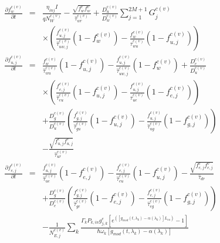 \documentclass[twocolumn]{el-author}
\begin{document}
\begingroup\makeatletter{}\check@mathfonts
\begin{eqnarray}
  \label{eq:pc_qd_qw}
  \frac{ {\partial}f^{c(v)}_{w} }{ {\partial}t } & = & 
	\frac{\eta_{inj}I}{qN^{c(v)}_{W}} - 
	\frac{ \sqrt{ f^{c}_{w} f^{v}_{w} } }{ \hat{\tau}^{c(v)}_{wr} } + 
	\frac{ D^{c(v)}_{u} }{ D^{c(v)}_{w} } \sum_{j=1}^{2M+1} G^{c(v)}_{j} \nonumber\\ &&
	\times
	\left(
		\frac{ f^{c(v)}_{u,j} }{ \hat{\tau}^{c(v)}_{uw,j} }	\left(1 - f^{c(v)}_{w} \right) -
		\frac{ f^{c(v)}_{w}  }{ \hat{\tau}^{c(v)}_{wu}  } 	\left(1 - f^{c(v)}_{u,j}\right)
	\right)
  \\
  \label{eq:pc_qd_us}
  \frac{ {\partial}f^{c(v)}_{u,j} }{ {\partial}t } & = & 
	\frac{ f^{c(v)}_{w}  }{ \hat{\tau}^{c(v)}_{wu}  }	\left(1 - f^{c(v)}_{u,j}\right) -
	\frac{ f^{c(v)}_{u,j} }{ \hat{\tau}^{c(v)}_{uw,j} }	\left(1 - f^{c(v)}_{w} \right) + \frac{ D^{c(v)}_{e} }{ D^{c(v)}_{u} } \nonumber\\ &&
	\times \left(
		\frac{ f^{c(v)}_{e,j} }{ \hat{\tau}^{c(v)}_{eu} } \left(1 - f^{c(v)}_{u,j}\right) -
		\frac{ f^{c(v)}_{u,j} }{ \hat{\tau}^{c(v)}_{ue} } \left(1 - f^{c(v)}_{e,j}\right)
	\right)  \nonumber\\ &&
	+ \frac{ D^{c(v)}_{g} }{ D^{c(v)}_{u} } \left(
		\frac{ f^{c(v)}_{g,j} }{ \hat{\tau}^{c(v)}_{gu} } \left(1 - f^{c(v)}_{u,j}\right) -
		\frac{ f^{c(v)}_{u,j} }{ \hat{\tau}^{c(v)}_{ug} } \left(1 - f^{c(v)}_{g,j}\right)
	\right)  \nonumber\\ &&
	- \frac{ \sqrt{ f^{c}_{u,j} f^{v}_{u,j} } }{ \hat{\tau}^{c(v)}_{ur} }
  \\
  \label{eq:pc_qd_es}
  \frac{ {\partial}f^{c(v)}_{e,j} }{ {\partial}t } & = & 
	\frac{ f^{c(v)}_{u,j} }{ \hat{\tau}^{c(v)}_{ue} }	\left(1 - f^{c(v)}_{e,j}\right) -
	\frac{ f^{c(v)}_{e,j} }{ \hat{\tau}^{c(v)}_{eu} }	\left(1 - f^{c(v)}_{u,j}\right) -
	\frac{ \sqrt{ f^{c}_{e,j} f^{v}_{e,j} } }{ \hat{\tau}_{dr} } \nonumber\\ &&
	+ \frac{ D^{c(v)}_{g} }{ D^{c(v)}_{e} } \left(
		\frac{ f^{c(v)}_{g,j} }{ \hat{\tau}^{c(v)}_{ge} } \left(1 - f^{c(v)}_{e,j}\right) -
		\frac{ f^{c(v)}_{e,j} }{ \hat{\tau}^{c(v)}_{eg} } \left(1 - f^{c(v)}_{g,j}\right)
	\right)  \nonumber\\ &&
	- \frac{ 1 }{ N^{c(v)}_{E,j} } \sum_{k} \frac
		{\Gamma_{k}P_{k,in}g^{e}_{j,k}\left[e^{\left(\left[g_{mod}(t,\lambda_{k}) - \alpha(\lambda_{k})\right]L_{ca}\right)} - 1\right]}
		{\hbar \omega_{k}\left[g_{mod}(t,\lambda_{k}) - \alpha(\lambda_{k})\right]} \nonumber\\ &&

\end{eqnarray}
\end{document}
